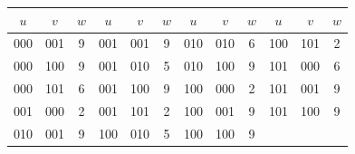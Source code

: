 \documentclass[11pt]{amsart}
\theoremstyle{remark}
\begin{document}
\begin{center}
\small
\begin{tabular}{ccc@{\qquad}ccc@{\qquad}ccc@{\qquad}ccc}
\toprule
$u$ & $v$ & $w$ & $u$ & $v$ & $w$ & $u$ & $v$ & $w$ & $u$ & $v$ & $w$\\
\midrule
000 & 001 & 9 & 001 & 001 & 9 & 010 & 010 & 6 & 100 & 101 & 2 \\
000 & 100 & 9 & 001 & 010 & 5 & 010 & 100 & 9 & 101 & 000 & 6 \\
000 & 101 & 6 & 001 & 100 & 9 & 100 & 000 & 2 & 101 & 001 & 9 \\
001 & 000 & 2 & 001 & 101 & 2 & 100 & 001 & 9 & 101 & 100 & 9 \\
010 & 001 & 9 & 100 & 010 & 5 & 100 & 100 & 9 &     &     &   \\
\bottomrule
\end{tabular}
\end{center}
\end{document}
